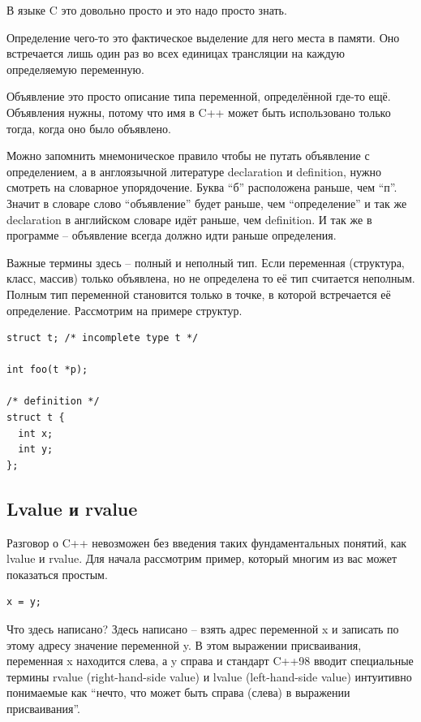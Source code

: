 \documentclass[a4paper,12pt,oneside]{article}
\begin{document}
В языке C это довольно просто и это надо просто знать.

Определение чего-то это фактическое выделение для него места в памяти. Оно встречается лишь один раз во всех единицах трансляции на каждую определяемую переменную.

Объявление это просто описание типа переменной, определённой где-то ещё. Объявления нужны, потому что имя в C++ может быть использовано только тогда, когда оно было объявлено.

Можно запомнить мнемоническое правило чтобы не путать объявление с определением, а в англоязычной литературе declaration и definition, нужно смотреть на словарное упорядочение.  Буква ``б'' расположена раньше, чем ``п''. Значит в словаре слово ``объявление'' будет раньше, чем ``определение'' и так же declaration в английском словаре идёт раньше, чем definition. И так же в программе – объявление всегда должно идти раньше определения.

Важные термины здесь – полный и неполный тип. Если переменная (структура, класс, массив) только объявлена, но не определена то её тип считается неполным. Полным тип переменной становится только в точке, в которой встречается её определение. Рассмотрим на примере структур.

\begin{lstlisting}
struct t; /* incomplete type t */

int foo(t *p);

/* definition */
struct t {
  int x;
  int y;
};
\end{lstlisting}

\subsection{Lvalue и rvalue}

Разговор о C++ невозможен без введения таких фундаментальных понятий, как lvalue и rvalue. Для начала рассмотрим пример, который многим из вас может показаться простым.

\begin{lstlisting}
x = y;
\end{lstlisting}

Что здесь написано? Здесь написано – взять адрес переменной x и записать по этому адресу значение переменной y. В этом выражении присваивания, переменная x находится слева, а y справа и стандарт C++98 вводит специальные термины rvalue (right-hand-side value) и lvalue (left-hand-side value) интуитивно понимаемые как ``нечто, что может быть справа (слева) в выражении присваивания''. 
\end{document}
